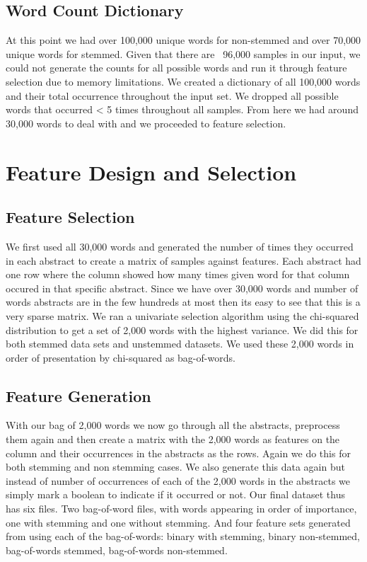 \documentclass{acm_proc_article-sp}
\begin{document}
\subsection{Word Count Dictionary}
At this point we had over 100,000 unique words for non-stemmed and over 70,000 unique words for stemmed. Given that there are ~96,000 samples in our input, we could not generate the counts for all possible words and run it through feature selection due to memory limitations. We created a dictionary of all 100,000 words and their total occurrence throughout the input set. We dropped all possible words that occurred < 5 times throughout all samples. From here we had around 30,000 words to deal with and we proceeded to feature selection. 








\section{Feature Design and Selection}
\subsection{Feature Selection}
We first used all 30,000 words and generated the number of times they occurred in each abstract to create a matrix of samples against features. Each abstract had one row where the column showed how many times given word for that column occured in that specific abstract. Since we have over 30,000 words and number of words abstracts are in the few hundreds at most then its easy to see that this is a very sparse matrix. We ran a univariate selection algorithm using the chi-squared distribution to get a set of 2,000 words with the highest variance. We did this for both stemmed data sets and unstemmed datasets. We used these 2,000 words in order of presentation by chi-squared as bag-of-words. 

\subsection{Feature Generation}
With our bag of 2,000 words we now go through all the abstracts, preprocess them again and then create a matrix with the 2,000 words as features on the column and their occurrences in the abstracts as the rows. Again we do this for both stemming and non stemming cases. We also generate this data again but instead of number of occurrences of each of the 2,000 words in the abstracts we simply mark a boolean to indicate if it occurred or not. Our final dataset thus has six files. Two bag-of-word files, with words appearing in order of importance, one with stemming and one without stemming. And four feature sets generated from using each of the bag-of-words: binary with stemming, binary non-stemmed, bag-of-words stemmed, bag-of-words non-stemmed.
\end{document}
